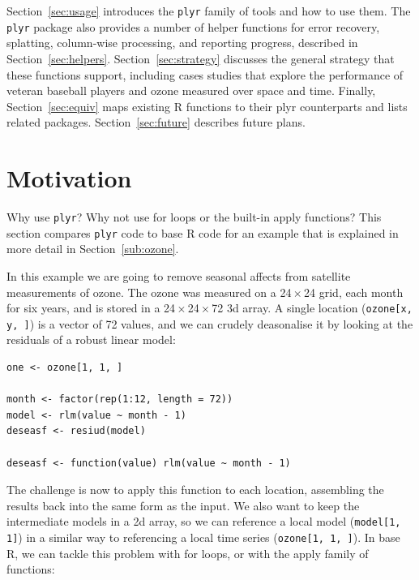 \documentclass[letterpage]{scrartcl}
\newcommand{\code}[1]{\lstinline!#1!}
\newcommand{\plyr}{{\tt plyr}\xspace}
\begin{document}
Section~\ref{sec:usage} introduces the {\tt plyr} family of tools and how to use them.  The {\tt plyr} package also provides a number of helper functions for error recovery, splatting, column-wise processing, and reporting progress,  described in Section~\ref{sec:helpers}. Section~\ref{sec:strategy} discusses the general strategy that these functions support, including cases studies that explore the performance of veteran baseball players and ozone measured over space and time.  Finally, Section~\ref{sec:equiv} maps existing R functions to their plyr counterparts and lists related packages.  Section~\ref{sec:future} describes future plans.

\section{Motivation}
\label{sec:motivation}

Why use \plyr?  Why not use for loops or the built-in apply functions?  This section compares \plyr code to base R code for an example that is explained in more detail in Section~\ref{sub:ozone}.  

In this example we are going to remove seasonal affects from satellite measurements of ozone.  The ozone was measured on a 24\,$\times$\,24 grid, each month for six years, and is stored in a 24\,$\times$\,24\,$\times$\,72 3d array. A single location (\code{ozone[x, y, ]}) is a vector of 72 values, and we can crudely deasonalise it by looking at the residuals of a robust linear model:

\begin{verbatim}
one <- ozone[1, 1, ]

month <- factor(rep(1:12, length = 72))
model <- rlm(value ~ month - 1)
deseasf <- resiud(model)

deseasf <- function(value) rlm(value ~ month - 1)
\end{verbatim}

The challenge is now to apply this function to each location, assembling the results back into the same form as the input.  We also want to keep the intermediate models in a 2d array, so we can reference a local model (\code{model[1, 1]}) in a similar way to referencing a local time series (\code{ozone[1, 1, ]}).  In base R, we can tackle this problem with for loops, or with the apply family of functions:
\end{document}
